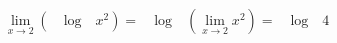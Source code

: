 \begin{ex}
\begin{align}
&\lim_{x\rightarrow 2} (\quad\text{log}\quad x^2) =\quad\text{log}\quad(\lim_{x\rightarrow 2} x^2) = \quad\text{log}\quad4\nonumber
\end{align}
\end{ex}